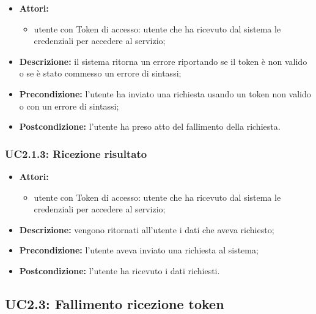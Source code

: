 \begin{itemize}
	\item \textbf{Attori:}
	\begin{itemize}
		\item utente con Token di accesso: utente che ha ricevuto dal sistema le credenziali per accedere al servizio;
	\end{itemize}
	\item \textbf{Descrizione:} il sistema ritorna un errore riportando se il token è non valido o se è stato commesso un errore di sintassi;
	\item \textbf{Precondizione:} l'utente ha inviato una richiesta usando un token non valido o con un errore di sintassi;
	\item \textbf{Postcondizione:} l'utente ha preso atto del fallimento della richiesta.
\end{itemize}

\subsubsection{UC2.1.3: Ricezione risultato}

\begin{itemize}
	\item \textbf{Attori:}
	\begin{itemize}
		\item utente con Token di accesso: utente che ha ricevuto dal sistema le credenziali per accedere al servizio;
	\end{itemize}
	\item \textbf{Descrizione:} vengono ritornati all'utente i dati che aveva richiesto;
	\item \textbf{Precondizione:} l'utente aveva inviato una richiesta al sistema;
	\item \textbf{Postcondizione:} l'utente ha ricevuto i dati richiesti.
\end{itemize}


\pagebreak

\subsection{UC2.3: Fallimento ricezione token}


